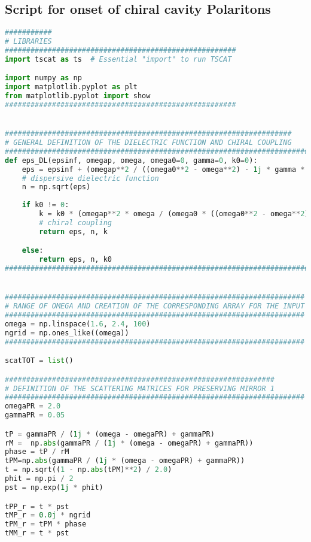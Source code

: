 \documentclass[showpacs,aps,prl,onecolumn,superscriptaddress]{revtex4-1}
\begin{document}
\subsection{Script for onset of chiral cavity Polaritons}
\begin{lstlisting}[language=Python, caption=Script for Figure 15]
###########
# LIBRARIES
######################################################
import tscat as ts  # Essential "import" to run TSCAT

import numpy as np
import matplotlib.pyplot as plt
from matplotlib.pyplot import show
######################################################


###################################################################
# GENERAL DEFINITION OF THE DIELECTRIC FUNCTION AND CHIRAL COUPLING
################################################################################################
def eps_DL(epsinf, omegap, omega, omega0=0, gamma=0, k0=0):
    eps = epsinf + (omegap**2 / ((omega0**2 - omega**2) - 1j * gamma * omega))  
    # dispersive dielectric function
    n = np.sqrt(eps)
    
    if k0 != 0:
        k = k0 * (omegap**2 * omega / (omega0 * ((omega0**2 - omega**2) - 1j * gamma * omega)))  
        # chiral coupling
        return eps, n, k

    else:
        return eps, n, k0
#################################################################################################


######################################################################
# RANGE OF OMEGA AND CREATION OF THE CORRESPONDING ARRAY FOR THE INPUT
######################################################################
omega = np.linspace(1.6, 2.4, 100)
ngrid = np.ones_like((omega))
######################################################################

scatTOT = list()

###############################################################
# DEFINITION OF THE SCATTERING MATRICES FOR PRESERVING MIRROR 1
######################################################################
omegaPR = 2.0
gammaPR = 0.05

tP = gammaPR / (1j * (omega - omegaPR) + gammaPR)
rM =  np.abs(gammaPR / (1j * (omega - omegaPR) + gammaPR))
phase = tP / rM
tPM=np.abs(gammaPR / (1j * (omega - omegaPR) + gammaPR))
t = np.sqrt((1 - np.abs(tPM)**2) / 2.0)
phit = np.pi / 2
pst = np.exp(1j * phit)

tPP_r = t * pst 
tMP_r = 0.0j * ngrid
tPM_r = tPM * phase 
tMM_r = t * pst


\end{lstlisting}
\end{document}
